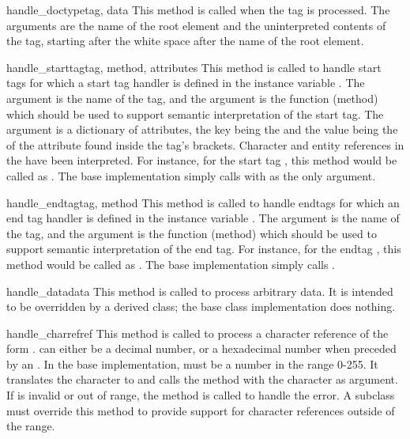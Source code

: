 \begin{methoddesc}{handle_doctype}{tag, data}
This method is called when the  tag is processed.
The arguments are the name of the root element and the uninterpreted
contents of the tag, starting after the white space after the name of
the root element.
\end{methoddesc}

\begin{methoddesc}{handle_starttag}{tag, method, attributes}
This method is called to handle start tags for which a start tag
handler is defined in the instance variable .  The
 argument is the name of the tag, and the 
argument is the function (method) which should be used to support semantic
interpretation of the start tag.  The  argument is a
dictionary of attributes, the key being the  and the value
being the  of the attribute found inside the tag's
\code{<>} brackets.  Character and entity references in the
 have been interpreted.  For instance, for the start tag
, this method would be called as
.
The base implementation simply calls  with 
as the only argument.
\end{methoddesc}

\begin{methoddesc}{handle_endtag}{tag, method}
This method is called to handle endtags for which an end tag handler
is defined in the instance variable .  The 
argument is the name of the tag, and the  argument is the
function (method) which should be used to support semantic
interpretation of the end tag.  For instance, for the endtag
, this method would be called as .  The base implementation simply calls
.
\end{methoddesc}

\begin{methoddesc}{handle_data}{data}
This method is called to process arbitrary data.  It is intended to be
overridden by a derived class; the base class implementation does
nothing.
\end{methoddesc}

\begin{methoddesc}{handle_charref}{ref}
This method is called to process a character reference of the form
.   can either be a decimal number,
or a hexadecimal number when preceded by an .
In the base implementation,  must be a number in the
range 0-255.  It translates the character to \ASCII{} and calls the
method  with the character as argument.  If
 is invalid or out of range, the method
 is called to handle the error.  A
subclass must override this method to provide support for character
references outside of the \ASCII{} range.
\end{methoddesc}

